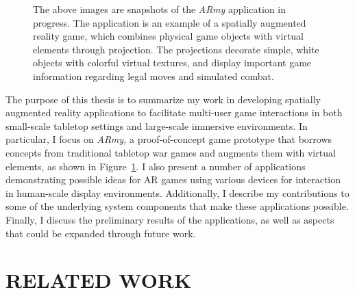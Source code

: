 \documentclass{thesis}
\begin{document}
\begin{figure}[b]
\caption[Images of ARmy: A Spatially Augmented Reality Game]{ The above images are snapshots of the \emph{ARmy} application in progress. The application is an example of a spatially augmented reality game, which combines physical game objects with virtual elements through projection. The projections decorate simple, white objects with colorful virtual textures, and display important game information regarding legal moves and simulated combat. }
\label{FIGURE:GameInProgress}
\end{figure}

The purpose of this thesis is to summarize my work in developing spatially augmented reality applications to facilitate multi-user game interactions in both small-scale tabletop settings and large-scale immersive environments. In particular, I focus on \emph{ARmy,} a proof-of-concept game prototype that borrows concepts from traditional tabletop war games and augments them with virtual elements, as shown in Figure~\ref{FIGURE:GameInProgress}. I also present a number of applications demonstrating possible ideas for AR games using various devices for interaction in human-scale display environments. Additionally, I describe my contributions to some of the underlying system components that make these applications possible. Finally, I discuss the preliminary results of the applications, as well as aspects that could be expanded through future work.


\chapter{RELATED WORK}
\end{document}
